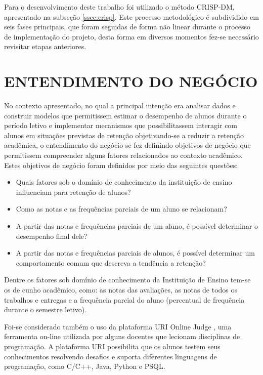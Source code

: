 Para o desenvolvimento deste trabalho foi utilizado o método CRISP-DM, apresentado na subseção \ref{ssec:crisp}. 
Este processo metodológico é subdividido em seis fases principais, que foram seguidas de forma não linear durante o processo de implementação do projeto, desta forma em diversos momentos fez-se necessário revisitar etapas anteriores.

\section{ENTENDIMENTO DO NEGÓCIO}
\label{sec:entendimentoNegocio2}
No contexto apresentado, no qual a principal intenção era analisar dados e construir modelos que permitissem estimar o desempenho de alunos durante o período letivo e implementar mecanismos que possibilitassem interagir com alunos em situações previstas de retenção objetivando-se a reduzir a retenção acadêmica, o entendimento do negócio se fez definindo objetivos de negócio que permitissem compreender alguns fatores relacionados ao contexto acadêmico. 
Estes objetivos de negócio foram definidos por meio das seguintes questões:

\begin{itemize}[topsep=5pt]
    \item Quais fatores sob o domínio de conhecimento da instituição de ensino influenciam para retenção de alunos?
    \item Como as notas e as frequências parciais de um aluno se relacionam?
    \item A partir das notas e frequências parciais de um aluno, é possível determinar o desempenho final dele?
    \item A partir das notas e frequências parciais de alunos, é possível determinar um comportamento comum que descreva a tendência a retenção?
\end{itemize}

Dentre os fatores sob domínio de conhecimento da Instituição de Ensino tem-se os de cunho acadêmico, como:
as notas das avaliações, as notas de todos os trabalhos e entregas e a frequência parcial do aluno (percentual de frequência durante o semestre letivo).
    

Foi-se considerado também o uso da plataforma URI Online Judge \cite{URI}, uma ferramenta on-line utilizada por alguns docentes que lecionam disciplinas de programação. A plataforma URI possibilita que os alunos testem seus conhecimentos resolvendo desafios e suporta diferentes linguagens de programação, como C/C++, Java, Python e PSQL.

